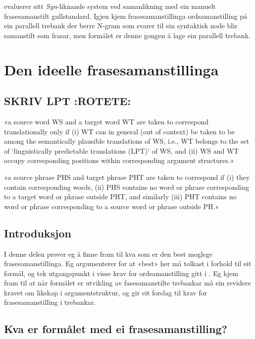 \documentclass[11pt,a4paper,oneside,draft]{book}
\begin{document}
\citet{samuelsson2007apa} evaluerer sitt \emph{Syn}-liknande system
ved samanlikning med ein manuelt frasesamanstilt gullstandard.  Igjen
kjem frasesamanstillinga ordsamanstilling på ein parallell trebank der
berre N-gram som svarer til ein syntaktisk node blir samanstilt som
frasar, men formålet er denne gongen å lage ein parallell trebank.
\chapter{Den ideelle frasesamanstillinga}
\label{sec-3}

\label{SEC:ideell}
\section{\textbf{SKRIV} LPT \textbf{:ROTETE:}}
\label{sec-3.1}

«a source word WS and a target word WT are taken to correspond
translationally only if (i) WT can in general (out of context) be
taken to be among the semantically plausible translations of WS, i.e.,
WT belongs to the set of `linguistically predictable translations
(LPT)' of WS, and (ii) WS and WT occupy corresponding positions within
corresponding argument structures.»

«a source phrase PHS and target phrase PHT are taken to correspond if
(i) they contain corresponding words, (ii) PHS contains no word or
phrase corresponding to a target word or phrase outside PHT, and
similarly (iii) PHT contains no word or phrase corresponding to a
source word or phrase outside PH.»

\section{Introduksjon}
\label{sec-3.2}

I denne delen prøver eg å finne fram til kva som er den best moglege
frasesamanstillinga. Eg argumenterer for at «best» her må tolkast i
forhold til eit formål, og tek utgangspunkt i visse krav for
ordsamanstilling gitt i \citet{thunes2003eal}. Eg kjem fram til at når
formålet er utvikling av fasesamanstilte trebankar må ein revidere
kravet om likskap i argumentstruktur, og gir eit forslag til krav for
frasesamanstilling i trebankar.

\section{Kva er formålet med ei frasesamanstilling?}
\label{sec-3.3}
\end{document}
